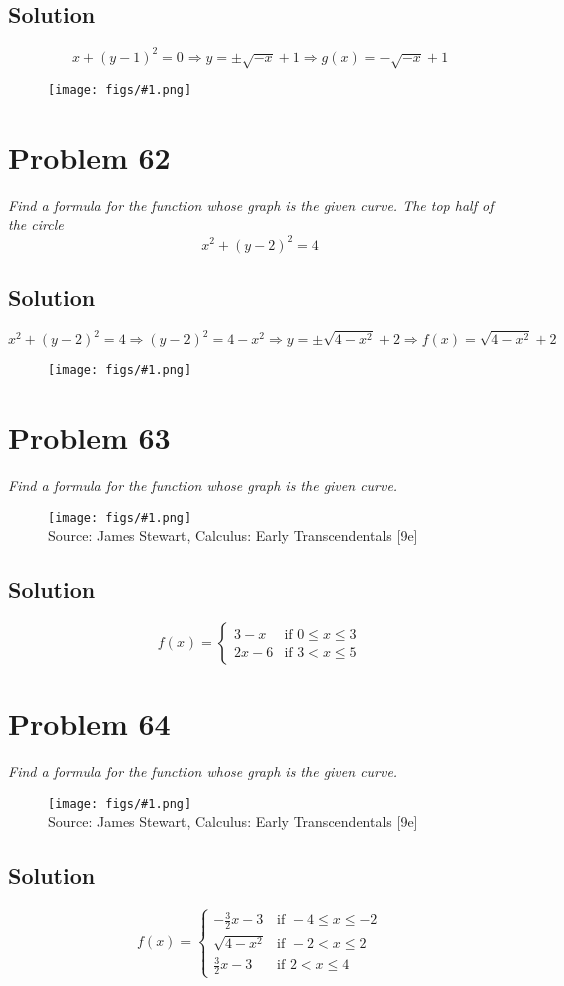 \documentclass[11pt]{article}
\newcommand{\soln}{\subsection*}
\newcommand{\qn}{\textit}
\newcommand{\imagesource}[1]{{\footnotesize Source: #1}}
\newcommand{\imgqn}[1]{
	\begin{figure}[H]
		\centering
		\texttt{[image: figs/\#1.png]}\\
		\imagesource{James Stewart, Calculus: Early Transcendentals [9e]}
	\end{figure}
}
\newcommand{\imgsoln}[1]{
	\begin{figure}[H]
		\centering
		\texttt{[image: figs/\#1.png]}
	\end{figure}
}
\begin{document}
\soln{Solution}
\begin{equation*}
	x+(y-1)^2=0 \Rightarrow y=\pm\sqrt{-x}+1 \Rightarrow g(x)=-\sqrt{-x}+1
\end{equation*}
\imgsoln{1.1.61-ans}

\section*{Problem 62}

\qn{Find a formula for the function whose graph is the given curve. The top half of the circle $$x^2+(y-2)^2=4$$}

\soln{Solution}
\begin{equation*}
	x^2+(y-2)^2=4 \Rightarrow (y-2)^2=4-x^2 \Rightarrow y=\pm\sqrt{4-x^2}+2 \Rightarrow f(x)=\sqrt{4-x^2}+2
\end{equation*}
\imgsoln{1.1.62-ans}

\section*{Problem 63}

\qn{Find a formula for the function whose graph is the given curve.}

\imgqn{1.1.63}

\soln{Solution}
\begin{equation*}
	f(x)=
	\begin{cases}
		3-x & \text{if } 0 \le x \le 3\\
		2x-6 & \text{if } 3 < x \le 5
	\end{cases}
\end{equation*}

\section*{Problem 64}

\qn{Find a formula for the function whose graph is the given curve.}

\imgqn{1.1.64}

\soln{Solution}
\begin{equation*}
	f(x)=
	\begin{cases}
		-\frac{3}{2}x-3 & \text{if } -4 \le x \le -2\\
		\sqrt{4-x^2} & \text{if } -2 < x \le 2 \\
		\frac{3}{2}x-3 & \text{if } 2 < x \le 4
	\end{cases}
\end{equation*}
\end{document}
